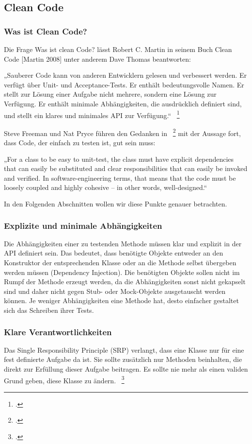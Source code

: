 \subsection{Clean Code}
\subsubsection{Was ist Clean Code?}
Die Frage Was ist clean Code? lässt Robert C. Martin in seinem Buch Clean Code
[Martin 2008] unter anderem Dave Thomas beantworten:

„Sauberer Code kann von anderen Entwicklern gelesen und verbessert werden. Er verfügt
über Unit- und Acceptance-Tests. Er enthält bedeutungsvolle Namen. Er stellt zur
Lösung einer Aufgabe nicht mehrere, sondern eine Lösung zur Verfügung. Er enthält
minimale Abhängigkeiten, die ausdrücklich definiert sind, und stellt ein klares und
minimales API zur Verfügung.“ ~\footcite[Vgl.]{Martin.2008}

Steve Freeman und Nat Pryce führen den Gedanken in ~\footcite[Vgl.]{Freeman.2009} mit der Aussage
fort, dass Code, der einfach zu testen ist, gut sein muss:

„For a class to be easy to unit-test, the class must have explicit dependencies that can
easily be substituted and clear responsibilities that can easily be invoked and verified.
In software-engineering terms, that means that the code must be loosely coupled and
highly cohesive – in other words, well-designed.“

In den Folgenden Abschnitten wollen wir diese Punkte genauer betrachten.

\subsubsection{Explizite und minimale Abhängigkeiten} %
Die Abhängigkeiten einer zu testenden Methode müssen klar und explizit in der API definiert sein. Das bedeutet, dass benötigte Objekte entweder an den Konstruktor der entsprechenden Klasse oder an die Methode selbst übergeben werden müssen (Dependency Injection). Die benötigten Objekte sollen nicht im Rumpf der Methode erzeugt werden, da die Abhängigkeiten sonst nicht gekapselt sind und daher nicht gegen Stub- oder Mock-Objekte ausgetauscht werden können. Je weniger Abhängigkeiten eine Methode hat, desto einfacher gestaltet sich das Schreiben ihrer Tests.

\subsubsection{Klare Verantwortlichkeiten}
Das Single Responsibility Principle (SRP) verlangt, dass eine Klasse nur für eine
fest definierte Aufgabe da ist. Sie sollte zusätzlich nur Methoden beinhalten, die direkt
zur Erfüllung dieser Aufgabe beitragen. Es sollte nie mehr als einen validen Grund geben, diese Klasse zu ändern. ~\footcite[Vgl.]{Martin.2002}

